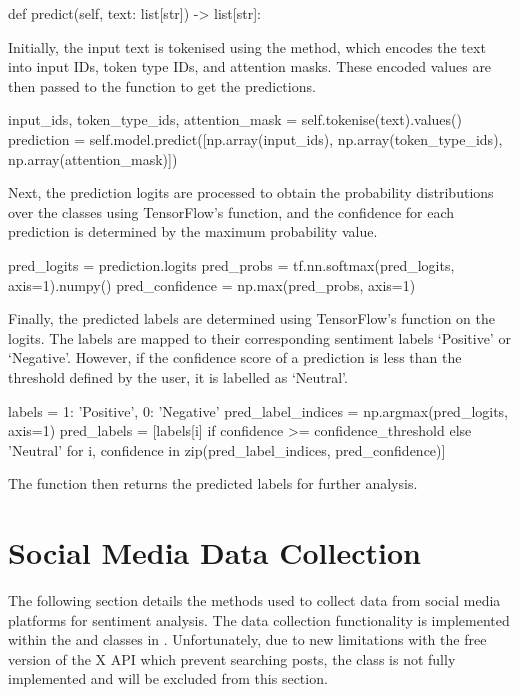     \begin{python}
def predict(self, text: list[str]) -> list[str]:
    \end{python}

    Initially, the input text is tokenised using the  method, which encodes the text into input IDs, token type IDs, and attention masks. These encoded values are then passed to the  function to get the predictions.

    \begin{python}
input_ids, token_type_ids, attention_mask = self.tokenise(text).values()
prediction = self.model.predict([np.array(input_ids), np.array(token_type_ids), np.array(attention_mask)])
    \end{python}

    Next, the prediction logits are processed to obtain the probability distributions over the classes using TensorFlow's  function, and the confidence for each prediction is determined by the maximum probability value.

    \begin{python}
pred_logits = prediction.logits
pred_probs = tf.nn.softmax(pred_logits, axis=1).numpy()
pred_confidence = np.max(pred_probs, axis=1)
    \end{python}

    Finally, the predicted labels are determined using TensorFlow's  function on the logits. The labels are mapped to their corresponding sentiment labels `Positive' or `Negative'. However, if the confidence score of a prediction is less than the threshold defined by the user, it is labelled as `Neutral'.

    \begin{python}
labels = {1: 'Positive', 0: 'Negative'}
pred_label_indices = np.argmax(pred_logits, axis=1)
pred_labels = [labels[i] if confidence >= confidence_threshold else 'Neutral' for i, confidence in zip(pred_label_indices, pred_confidence)]
    \end{python}

    The function then returns the predicted labels for further analysis.

\section{Social Media Data Collection}
The following section details the methods used to collect data from social media platforms for sentiment analysis. The data collection functionality is implemented within the  and  classes in . Unfortunately, due to new limitations with the free version of the X API which prevent searching posts, the  class is not fully implemented and will be excluded from this section.


